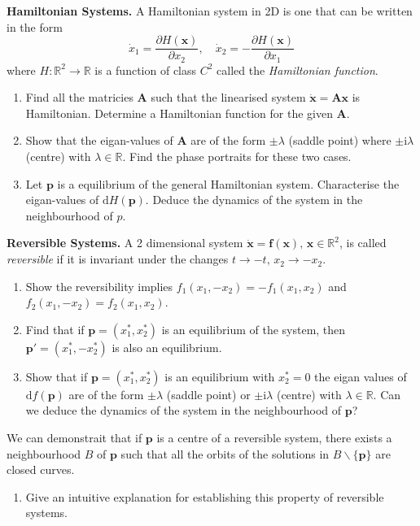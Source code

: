 \documentclass{article}
\renewcommand{\i}{\mathrm{i}}
\newcommand{\diff}{\text{d}}
\begin{document}
\begin{question}
  \textbf{Hamiltonian Systems.} A Hamiltonian system in 2D is one that can be written in the form
  \begin{equation}
    \dot x_1 = \frac{\partial H(\bm x) }{\partial x_2}, \quad  \dot x_2 = -\frac{\partial H(\bm x) }{\partial x_1}
  \end{equation}
  where $H : \mathbb R^2 \to \mathbb R$ is a function of class $C^2$ called the \textit{Hamiltonian function}.
 \begin{enumerate}[label=(\alph*)]
  \item Find all the matricies $\bm A$ such that the linearised system $\dot{\bm x} = \bm A \bm x$ is Hamiltonian. Determine a Hamiltonian function for the given $\bm A$.
  \item Show that the eigan-values of $\bm A$ are of the form $\pm \lambda$ (saddle point) where $\pm \i \lambda$ (centre) with $\lambda \in \mathbb R$. Find the phase portraits for these two cases.
    
  \item Let $\bm p$ is a equilibrium of the general Hamiltonian system. Characterise the eigan-values of $\diff H(\bm p)$. Deduce the dynamics of the system in the neighbourhood of $p$.
 \end{enumerate}

\end{question}

\begin{question}
  \textbf{Reversible Systems.} A 2 dimensional system $\dot{\bm x} = \bm f(\bm x),\,\bm x \in \mathbb R^2$, is called \textit{reversible} if it is invariant under the changes $t\to -t,\, x_2 \to -x_2$.
  \begin{enumerate}[label=(\alph*)]
    \item Show the reversibility implies $f_1(x_1,-x_2)=-f_1(x_1,x_2)$ and $f_2(x_1,-x_2)=f_2(x_1,x_2)$.
    \item Find that if $\bm p = (x_1^\ast,x_2^\ast)$ is an equilibrium of the system, then $\bm p' = (x_1^\ast,-x_2^\ast)$ is also an equilibrium.
    \item Show that if $\bm p = (x_1^\ast,x_2^\ast)$ is an equilibrium with $x_2^\ast =0$ the eigan values of $\diff f(\bm p)$ are of the form $\pm \lambda$ (saddle point) or $\pm \i \lambda$ (centre) with $\lambda \in \mathbb R$. Can we deduce the dynamics of the system in the neighbourhood of $\bm p$?
  \end{enumerate}
  We can demonstrait that if $\bm p$ is a centre of a reversible system, there exists a neighbourhood $B$ of $\bm p$ such that all the orbits of the solutions in $B\backslash \{\bm p\}$ are closed curves. 
  \begin{enumerate}[label=(\alph*),resume]
    \item Give an intuitive explanation for establishing this property of reversible systems.
  \end{enumerate}
  
  \end{question}
 
\end{document}
